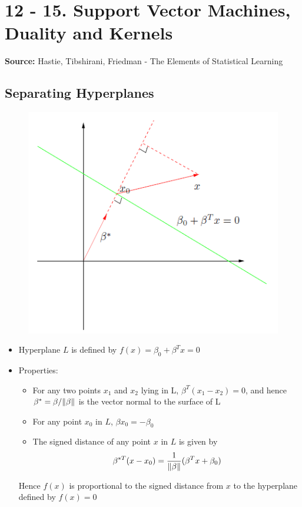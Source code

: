 \section*{12 - 15. Support Vector Machines, Duality and Kernels}
\textbf{Source:} Hastie, Tibshirani, Friedman - The Elements of Statistical Learning
\subsection*{Separating Hyperplanes}
\begin{figure}[H]
    \centering
    \includegraphics[scale=1]{figures/hyperplane}
\end{figure}
\begin{itemize}
    \item 
        Hyperplane $L$ is defined by $f(x) = \beta_0 + \beta^T x = 0$
    \item
        Properties:
        \begin{itemize}
            \item
                For any two points $x_1$ and $x_2$ lying in L, $\beta^T (x_1-x_2)=0$, and hence $\beta^* = \beta / \lVert\beta\rVert$ is the vector normal to the surface of L
            \item
                For any point $x_0$ in $L$, $\beta x_0 = -\beta_0$
            \item
                The signed distance of any point $x$ in $L$ is given by
                $$\beta^{*T} (x - x_0) = \frac{\displaystyle 1}{\displaystyle \lVert\beta\rVert} (\beta^T x + \beta_0)$$
        \end{itemize}
        Hence $f(x)$ is proportional to the signed distance from $x$ to the hyperplane defined by $f(x) = 0$
\end{itemize}

